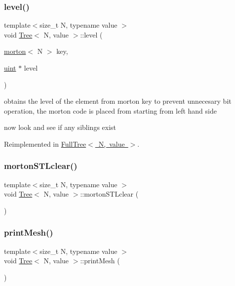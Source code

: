 \subsubsection{\texorpdfstring{level()}{level()}}
{\footnotesize\ttfamily template$<$size\+\_\+t N, typename value $>$ \\
void \mbox{\hyperlink{classTree}{Tree}}$<$ N, value $>$\+::level (\begin{DoxyParamCaption}\item[{\mbox{\hyperlink{definitions_8h_af8682350bd8bb38ee9023f7a0a310add}{morton}}$<$ N $>$}]{key,  }\item[{\mbox{\hyperlink{definitions_8h_a69aa29b598b851b0640aa225a9e5d61d}{uint}} $\ast$}]{level }\end{DoxyParamCaption})\hspace{0.3cm}{\ttfamily [virtual]}}

obtains the level of the element from morton key to prevent unnecesary bit operation, the morton code is placed from starting from left hand side

now look and see if any siblings exist 

Reimplemented in \mbox{\hyperlink{classFullTree_a2aadfbda309e246642550044712f98a0}{Full\+Tree$<$ N, value $>$}}.

\mbox{\label{classTree_ad5d7ea8995c06e23b58f1ba00403427c}} 
\subsubsection{\texorpdfstring{morton\+S\+T\+Lclear()}{mortonSTLclear()}}
{\footnotesize\ttfamily template$<$size\+\_\+t N, typename value $>$ \\
void \mbox{\hyperlink{classTree}{Tree}}$<$ N, value $>$\+::morton\+S\+T\+Lclear (\begin{DoxyParamCaption}{ }\end{DoxyParamCaption})}

\mbox{\label{classTree_a76dbe79f57a7f640a6427f4bb4c4adef}} 
\subsubsection{\texorpdfstring{print\+Mesh()}{printMesh()}}
{\footnotesize\ttfamily template$<$size\+\_\+t N, typename value $>$ \\
void \mbox{\hyperlink{classTree}{Tree}}$<$ N, value $>$\+::print\+Mesh (\begin{DoxyParamCaption}{ }\end{DoxyParamCaption})}

